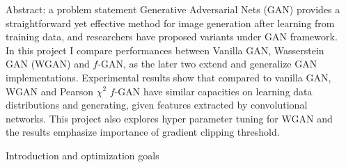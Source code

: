\documentclass[final]{beamer}
\newlength{\sepwidth}
\newlength{\colwidth}
\newcommand{\separatorcolumn}{\begin{column}{\sepwidth}\end{column}}
\begin{document}
\begin{frame}[t]
\begin{columns}[t]
\separatorcolumn

\begin{column}{\colwidth}

  \begin{block}{Abstract: a problem statement}
   Generative Adversarial Nets (GAN) provides a straightforward yet effective method for image generation after learning from training data, and researchers have proposed variants under GAN framework. In this project I compare performances between Vanilla GAN, Wasserstein GAN (WGAN) and $f$-GAN, as the later two extend and generalize GAN implementations. Experimental results show that compared to vanilla GAN, WGAN and Pearson $\chi^2$ $f$-GAN have similar capacities on learning data distributions and generating, given features extracted by convolutional networks. This project also explores hyper parameter tuning for WGAN and the results emphasize importance of gradient clipping threshold.

  \end{block}

  \begin{block}{Introduction and optimization goals}
  

\end{block}
\end{column}
\end{columns}
\end{frame}
\end{document}
